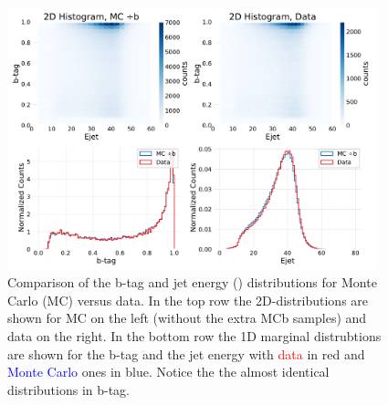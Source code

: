 \begin{figure}
  \includegraphics[width=0.95\textwidth, trim=0 0 0 40, clip]{figures/quarks/2d-histograms-ejet-btag-comparison-down_sample=1.00-ML_vars=vertex-selection=b-ejet_min=4-n_iter_RS_lgb=99-n_iter_RS_xgb=9-cdot_cut=0.90-version=19-njet=3.pdf}
  \caption[Monte Carlo -- Data bias for b-tags and jet energy]
          {Comparison of the b-tag and jet energy () distributions for Monte Carlo (MC) versus data. In the top row the 2D-distributions are shown for MC on the left (without the extra MCb samples) and data on the right. In the bottom row the 1D marginal distrubtions are shown for the b-tag and the jet energy with \textcolor{red}{data} in red and \textcolor{blue}{Monte Carlo} ones in blue. Notice the the almost identical distributions in b-tag. 
          } 
  \label{fig:q:btag_Ejet_comparison}
\end{figure}

